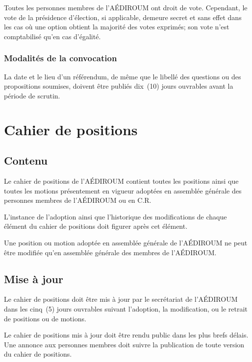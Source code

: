 \documentclass{aediroum}
\begin{document}
Toutes les personnes membres de l'AÉDIROUM ont droit de vote. Cependant, le vote de la présidence d'élection, si applicable, demeure secret et sans effet dans les cas où une option obtient la majorité des votes exprimés; son vote n'est comptabilisé qu'en cas d'égalité.

\subsubsection{Modalités de la convocation}\label{sec:modalites-convocation}

La date et le lieu d'un référendum, de même que le libellé des questions ou des propositions soumises, doivent être publiés dix~(10) jours ouvrables avant la période de scrutin.

\section{Cahier de positions}\label{sec:cahier-de-positions}

\subsection{Contenu}\label{sec:contenu-positions}

Le cahier de positions de l'AÉDIROUM contient toutes les positions ainsi que toutes les motions présentement en vigueur adoptées en assemblée générale des personnes membres de l'AÉDIROUM ou en C.R.

L'instance de l'adoption ainsi que l'historique des modifications de chaque élément du cahier de positions doit figurer après cet élément.

Une position ou motion adoptée en assemblée générale de l'AÉDIROUM ne peut être modifiée qu'en assemblée générale des membres de l'AÉDIROUM.

\subsection{Mise à jour}\label{sec:mise-a-jour-positions}

Le cahier de positions doit être mis à jour par le secrétariat de l'AÉDIROUM dans les cinq~(5) jours ouvrables suivant l'adoption, la modification, ou le retrait de positions ou de motions.

Le cahier de positions mis à jour doit être rendu public dans les plus brefs délais. Une annonce aux personnes membres doit suivre la publication de toute version du cahier de positions.
\end{document}
